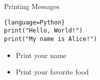 \begin{frame}[fragile]{Printing Messages}
	\begin{lstlisting}{language=Python}
print("Hello, World!")
print("My name is Alice!")
    \end{lstlisting}
	\pause
	\begin{itemize}
		\item Print your name
		\item Print your favorite food
	\end{itemize}
\end{frame}